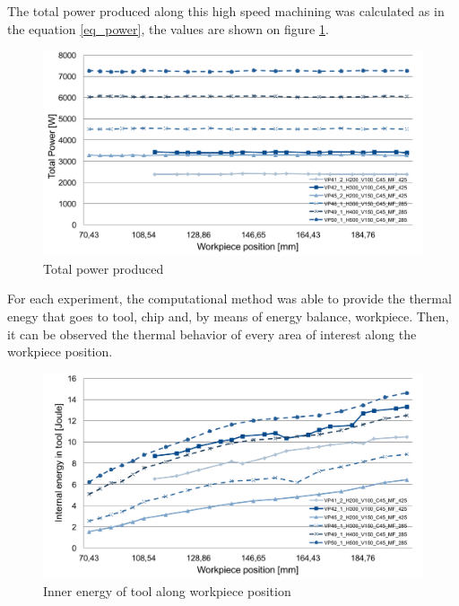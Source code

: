 	The total power produced along this high speed machining was calculated as in the equation \ref{eq_power}, the values are shown on figure \ref{fig:totPower}.

	\begin{figure}[H]
		\centering
		\captionsetup{justification=centering}
		\includegraphics[scale=0.55]{Imagens/Total_power.png}
		\caption{Total power produced}
		\label{fig:totPower}
	\end{figure}

	For each experiment, the computational method was able to provide the thermal enegy that goes to tool, chip and, by means of energy balance, workpiece. Then, it can be observed the thermal behavior of every area of interest along the workpiece position.

	\begin{figure}[H]
		\centering
		\captionsetup{justification=centering}
		\includegraphics[scale=0.55]{Imagens/Inner_Energy.png}
		\caption{Inner energy of tool along workpiece position}
		\label{fig:innerTool}
	\end{figure}

